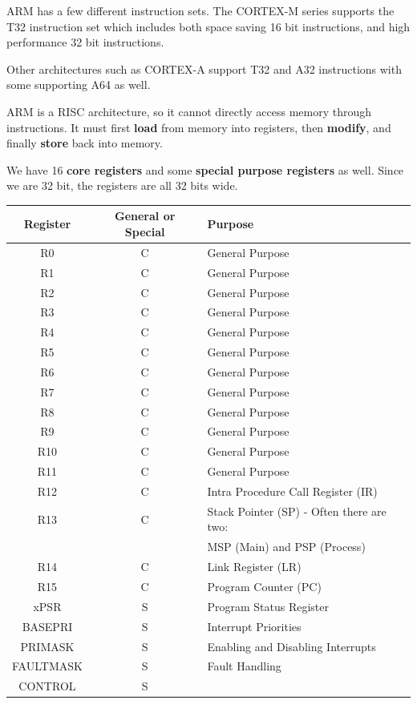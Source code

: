 \documentclass[12pt,letterpaper]{article} \usepackage{amsmath} \usepackage{graphicx} \usepackage[margin=1in]{geometry} \usepackage{longtable}  \usepackage{amssymb}
\begin{document}
	ARM has a few different instruction sets. The CORTEX-M series supports the T32 instruction set which includes both space saving 16 bit instructions, and high performance 32 bit instructions. 
	
	Other architectures such as CORTEX-A support T32 and A32 instructions with some supporting A64 as well. 
	
	ARM is a RISC architecture, so it cannot directly access memory through instructions. It must first \textbf{load} from memory into registers, then \textbf{modify}, and finally \textbf{store} back into memory.
	
	We have 16 \textbf{core registers} and some \textbf{special purpose registers }as well. Since we are 32 bit, the registers are all 32 bits wide. 
	\begin{center}
		\begin{tabular}{|c||c|l|}
			\hline
			Register & General or Special & Purpose \\
			\hline\hline
			R0 & C & General Purpose \\
			\hline
			R1 & C & General Purpose \\
			\hline
			R2 & C & General Purpose \\
			\hline
			R3 & C & General Purpose \\
			\hline
			R4 & C & General Purpose \\
			\hline
			R5 & C & General Purpose \\
			\hline
			R6 & C & General Purpose \\
			\hline
			R7 & C & General Purpose \\
			\hline
			R8 & C & General Purpose \\
			\hline
			R9 & C & General Purpose \\
			\hline
			R10 & C & General Purpose \\
			\hline
			R11 & C & General Purpose \\
			\hline
			R12 & C & Intra Procedure Call Register (IR) \\
			\hline
			R13 & C & Stack Pointer (SP) - Often there are two: \\&&MSP (Main) and PSP (Process) \\
			\hline
			R14 & C & Link Register (LR) \\
			\hline
			R15 & C & Program Counter (PC) \\
			\hline
			xPSR & S & Program Status Register \\
			\hline
			BASEPRI & S & Interrupt Priorities \\
			\hline
			PRIMASK & S & Enabling and Disabling Interrupts \\
			\hline
			FAULTMASK & S & Fault Handling \\
			\hline
			CONTROL & S &  \\
			\hline
		\end{tabular}
	\end{center}
	
\end{document}
